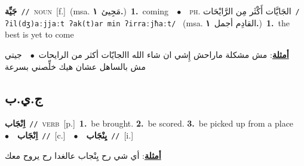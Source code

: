 \documentclass[10pt,a4paper,twoside]{article} %
\begin{document}
\begin{multicols}{2}
{\setlength\topsep{0pt}\textbf{\foreignlanguage{arabic}{جَيِّة}}\ {\color{gray}\texttt{//}\color{black}}\ \textsc{noun}\ [f.]\ \color{gray}(msa. \foreignlanguage{arabic}{مَجِيئ}~\foreignlanguage{arabic}{\textbf{١.}})\color{black}\ \textbf{1.}~coming\ \ $\bullet$\ \ \textsc{ph.} \color{gray} \foreignlanguage{arabic}{الجَايَّات أَكْثَر مِن الرَّايْحَات}\color{black}\ {\color{gray}\texttt{/{\sffamily ʔil(dʒ)aːjjaːt ʔak(t)ar min ʔirraːjħaːt}/}\color{black}}\ \color{gray} (msa. \foreignlanguage{arabic}{القادِم أجمل}~\foreignlanguage{arabic}{\textbf{١.}})\color{black}\ \textbf{1.}~the best is yet to come\  \begin{flushright}\color{gray}\foreignlanguage{arabic}{\textbf{\underline{\foreignlanguage{arabic}{أمثلة}}}: مش مشكلة ماراحش إِشي ان شاء الله االجايّات أكثر من الرايحات\ $\bullet$\ \  جيتي مش بالساهل عشان هيك خلِّصني بسرعة}\end{flushright}\color{black}} \vspace{2mm}

\vspace{-3mm}
\subsection*{\color{blue}\foreignlanguage{arabic}{ج.ي.ب}\color{blue}{}} 

{\setlength\topsep{0pt}\textbf{\foreignlanguage{arabic}{اِنْجَاب}}\ {\color{gray}\texttt{//}\color{black}}\ \textsc{verb}\ [p.]\ \textbf{1.}~be brought.  \textbf{2.}~be scored.  \textbf{3.}~be picked up from a place\ \ $\bullet$\ \ \setlength\topsep{0pt}\textbf{\foreignlanguage{arabic}{اِنْجَاب}}\ {\color{gray}\texttt{//}\color{black}}\ [c.]\ \ $\bullet$\ \ \setlength\topsep{0pt}\textbf{\foreignlanguage{arabic}{يِنْجَاب}}\ {\color{gray}\texttt{//}\color{black}}\ [i.]\  \begin{flushright}\color{gray}\foreignlanguage{arabic}{\textbf{\underline{\foreignlanguage{arabic}{أمثلة}}}: أي شي رح يِنْجاب عالغدا رح يروح معك}\end{flushright}\color{black}} \vspace{2mm}


\end{multicols}
\end{document}
